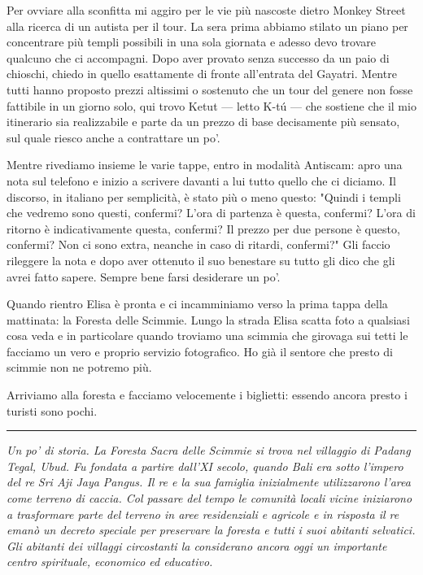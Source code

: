 Per ovviare alla sconfitta mi aggiro per le vie più nascoste dietro Monkey Street alla ricerca di un autista per il tour. La sera prima abbiamo stilato un piano per concentrare più templi possibili in una sola giornata e adesso devo trovare qualcuno che ci accompagni. Dopo aver provato senza successo da un paio di chioschi, chiedo in quello esattamente di fronte all'entrata del Gayatri. Mentre tutti hanno proposto prezzi altissimi o sostenuto che un tour del genere non fosse fattibile in un giorno solo, qui trovo Ketut — letto K-tú — che sostiene che il mio itinerario sia realizzabile e parte da un prezzo di base decisamente più sensato, sul quale riesco anche a contrattare un po'.

Mentre rivediamo insieme le varie tappe, entro in modalità Antiscam: apro una nota sul telefono e inizio a scrivere davanti a lui tutto quello che ci diciamo. Il discorso, in italiano per semplicità, è stato più o meno questo: "Quindi i templi che vedremo sono questi, confermi? L'ora di partenza è questa, confermi? L'ora di ritorno è indicativamente questa, confermi? Il prezzo per due persone è questo, confermi? Non ci sono extra, neanche in caso di ritardi, confermi?" Gli faccio rileggere la nota e dopo aver ottenuto il suo benestare su tutto gli dico che gli avrei fatto sapere. Sempre bene farsi desiderare un po'.

Quando rientro Elisa è pronta e ci incamminiamo verso la prima tappa della mattinata: la Foresta delle Scimmie. Lungo la strada Elisa scatta foto a qualsiasi cosa veda e in particolare quando troviamo una scimmia che girovaga sui tetti le facciamo un vero e proprio servizio fotografico. Ho già il sentore che presto di scimmie non ne potremo più.

Arriviamo alla foresta e facciamo velocemente i biglietti: essendo ancora presto i turisti sono pochi.

\begin{center}
    \noindent\rule{0.6\textwidth}{0.4pt}
\end{center}

\textit{Un po' di storia. La Foresta Sacra delle Scimmie si trova nel villaggio di Padang Tegal, Ubud. Fu fondata a partire dall'XI secolo, quando Bali era sotto l'impero del re Sri Aji Jaya Pangus. Il re e la sua famiglia inizialmente utilizzarono l'area come terreno di caccia. Col passare del tempo le comunità locali vicine iniziarono a trasformare parte del terreno in aree residenziali e agricole e in risposta il re emanò un decreto speciale per preservare la foresta e tutti i suoi abitanti selvatici. Gli abitanti dei villaggi circostanti la considerano ancora oggi un importante centro spirituale, economico ed educativo.}

